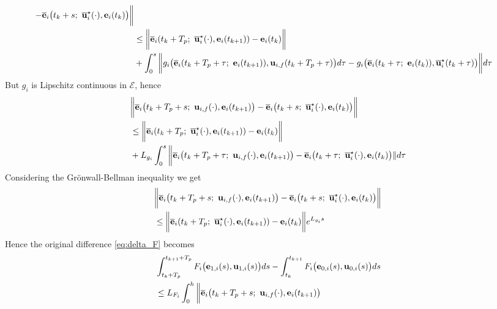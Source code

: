 \begin{bw_box}
\begin{alignat}{2}
      -\overline{\vect{e}}_i\big(t_k + s;\ \overline{\vect{u}}_i^{\star}(\cdot), \vect{e}_i(t_k)\big) \bigg\|\\
    &\leq \bigg\| \overline{\vect{e}}_i(t_k + T_p;\ \overline{\vect{u}}_i^{\star}(\cdot), \vect{e}_i(t_{k+1})) - \vect{e}_i(t_k) \bigg\| \\
    &+ \int_{0}^{s} \bigg\|g_i\big(\overline{\vect{e}}_i(t_k + T_p + \tau;\ \vect{e}_i(t_{k+1})), \vect{u}_{i,f}(t_k + T_p + \tau)\big) d\tau
    -  g_i\big(\overline{\vect{e}}_i(t_k + \tau;\ \vect{e}_i(t_k)), \overline{\vect{u}}_i^{\star}(t_k + \tau)\big) \bigg\| d\tau \\
  \end{alignat}
  But $g_i$ is Lipschitz continuous in $\mathcal{E}$, hence
  \begin{alignat}{2}
    &\bigg\| \overline{\vect{e}}_i\big(t_k + T_p + s;\ \vect{u}_{i,f}(\cdot), \vect{e}_i(t_{k+1})\big)
      -\overline{\vect{e}}_i\big(t_k + s;\ \overline{\vect{u}}_i^{\star}(\cdot), \vect{e}_i(t_k)\big) \bigg\|\\
    &\leq \bigg\| \overline{\vect{e}}_i(t_k + T_p;\ \overline{\vect{u}}_i^{\star}(\cdot), \vect{e}_i(t_{k+1})) - \vect{e}_i(t_k) \bigg\| \\
    &+ L_{g_i} \int_{0}^{s} \bigg\|\overline{\vect{e}}_i\big(t_k + T_p + \tau;\ \vect{u}_{i,f}(\cdot), \vect{e}_i(t_{k+1})\big)
      -\overline{\vect{e}}_i\big(t_k + \tau;\ \overline{\vect{u}}_i^{\star}(\cdot), \vect{e}_i(t_k)\big)\| d\tau \\
  \end{alignat}
  Considering the Gr\"{o}nwall-Bellman inequality we get
  \begin{alignat}{2}
    &\bigg\| \overline{\vect{e}}_i\big(t_k + T_p + s;\ \vect{u}_{i,f}(\cdot), \vect{e}_i(t_{k+1})\big)
      -\overline{\vect{e}}_i\big(t_k + s;\ \overline{\vect{u}}_i^{\star}(\cdot), \vect{e}_i(t_k)\big) \bigg\|\\
    &\leq \bigg\| \overline{\vect{e}}_i(t_k + T_p;\ \overline{\vect{u}}_i^{\star}(\cdot), \vect{e}_i(t_{k+1})) - \vect{e}_i(t_k) \bigg\| e^{L_{g_i}s}
  \end{alignat}
  Hence the original difference \eqref{eq:delta_F} becomes
  \begin{align}
    &\int_{t_k + T_p}^{t_{k+1} + T_p} F_i\big(\vect{e}_{1,i}(s), \vect{u}_{1,i}(s)\big) ds
      -\int_{t_k}^{t_{k+1}} F_i \big(\vect{e}_{0,i}(s), \vect{u}_{0,i} (s)\big) d s \\
    &\leq L_{F_i} \int_{0}^{h} \bigg\| \overline{\vect{e}}_i\big(t_k + T_p + s;\ \vect{u}_{i,f}(\cdot), \vect{e}_i(t_{k+1})\big)

\end{align}
\end{bw_box}
